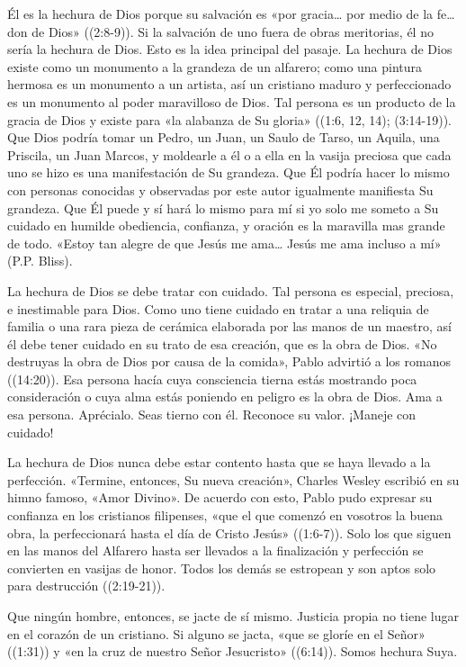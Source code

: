 \documentclass[12pt, twoside, openright]{book}
\begin{document}
Él es la hechura de Dios porque su salvación es «por gracia… por medio de la fe… don de Dios» ((2:8-9)). Si la salvación de uno fuera de obras meritorias, él no sería la hechura de Dios. Esto es la idea principal del pasaje. 
La hechura de Dios existe como un monumento a la grandeza de un alfarero; como una pintura hermosa es un monumento a un artista, así un cristiano maduro y perfeccionado es un monumento al poder maravilloso de Dios. Tal persona es un producto de la gracia de Dios y existe para «la alabanza de Su gloria» ((1:6, 12, 14); (3:14-19)). Que Dios podría tomar un Pedro, un Juan, un Saulo de Tarso, un Aquila, una Priscila, un Juan Marcos, y moldearle a él o a ella en la vasija preciosa que cada uno se hizo es una manifestación de Su grandeza. Que Él podría hacer lo mismo con personas conocidas y observadas por este autor igualmente manifiesta Su grandeza. Que Él puede y sí hará lo mismo para mí si yo solo me someto a Su cuidado en humilde obediencia, confianza, y oración es la maravilla mas grande de todo. «Estoy tan alegre de que Jesús me ama… Jesús me ama incluso a mí» (P.P. Bliss).

La hechura de Dios se debe tratar con cuidado. Tal persona es especial, preciosa, e inestimable para Dios. Como uno tiene cuidado en tratar a una reliquia de familia o una rara pieza de cerámica elaborada por las manos de un maestro, así él debe tener cuidado en su trato de esa creación, que es la obra de Dios. «No destruyas la obra de Dios por causa de la comida», Pablo advirtió a los romanos ((14:20)). Esa persona hacía cuya consciencia tierna estás mostrando poca consideración o cuya alma estás poniendo en peligro es la obra de Dios. Ama a esa persona. Aprécialo. Seas tierno con él. Reconoce su valor. ¡Maneje con cuidado!

La hechura de Dios nunca debe estar contento hasta que se haya llevado a la perfección. «Termine, entonces, Su nueva creación», Charles Wesley escribió en su himno famoso, «Amor Divino». De acuerdo con esto, Pablo pudo expresar su confianza en los cristianos filipenses, «que el que comenzó en vosotros la buena obra, la perfeccionará hasta el día de Cristo Jesús» ((1:6-7)). Solo los que siguen en las manos del Alfarero hasta ser llevados a la finalización y perfección se convierten en vasijas de honor. Todos los demás se estropean y son aptos solo para destrucción ((2:19-21)).

Que ningún hombre, entonces, se jacte de sí mismo. Justicia propia no tiene lugar en el corazón de un cristiano. Si alguno se jacta, «que se gloríe en el Señor» ((1:31)) y «en la cruz de nuestro Señor Jesucristo» ((6:14)). Somos hechura Suya.
\end{document}
